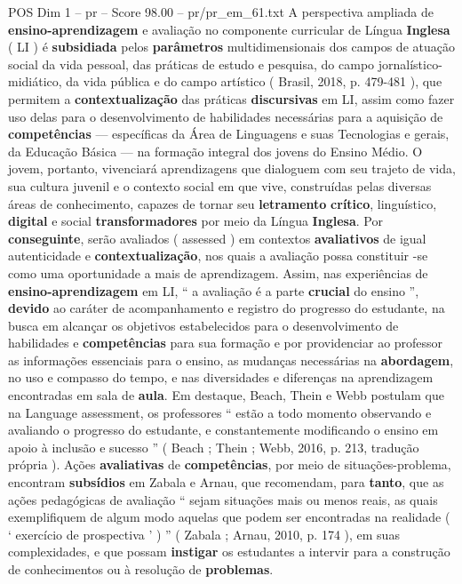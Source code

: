 \begin{textsample}{POS Dim 1 – pr – Score 98.00 – pr/pr\_em\_61.txt}
A perspectiva ampliada de \textbf{ensino-aprendizagem} e avaliação no componente curricular de Língua \textbf{Inglesa} ( LI ) é \textbf{subsidiada} pelos \textbf{parâmetros} multidimensionais dos campos de atuação social da vida pessoal, das práticas de estudo e pesquisa, do campo jornalístico-midiático, da vida pública e do campo artístico ( Brasil, 2018, p. 479-481 ), que permitem a \textbf{contextualização} das práticas \textbf{discursivas} em LI, assim como fazer uso delas para o desenvolvimento de habilidades necessárias para a aquisição de \textbf{competências} — específicas da Área de Linguagens e suas Tecnologias e gerais, da Educação Básica — na formação integral dos jovens do Ensino Médio.
O jovem, portanto, vivenciará aprendizagens que dialoguem com seu trajeto de vida, sua cultura juvenil e o contexto social em que vive, construídas pelas diversas áreas de conhecimento, capazes de tornar seu \textbf{letramento} \textbf{crítico}, linguístico, \textbf{digital} e social \textbf{transformadores} por meio da Língua \textbf{Inglesa}.
Por \textbf{conseguinte}, serão avaliados ( assessed ) em contextos \textbf{avaliativos} de igual autenticidade e \textbf{contextualização}, nos quais a avaliação possa constituir -se como uma oportunidade a mais de aprendizagem.
Assim, nas experiências de \textbf{ensino-aprendizagem} em LI, “ a avaliação é a parte \textbf{crucial} do ensino ”, \textbf{devido} ao caráter de acompanhamento e registro do progresso do estudante, na busca em alcançar os objetivos estabelecidos para o desenvolvimento de habilidades e \textbf{competências} para sua formação e por providenciar ao professor as informações essenciais para o ensino, as mudanças necessárias na \textbf{abordagem}, no uso e compasso do tempo, e nas diversidades e diferenças na aprendizagem encontradas em sala de \textbf{aula}.
Em destaque, Beach, Thein e Webb postulam que na Language assessment, os professores “ estão a todo momento observando e avaliando o progresso do estudante, e constantemente modificando o ensino em apoio à inclusão e sucesso ” ( Beach ; Thein ; Webb, 2016, p. 213, tradução própria ).
Ações \textbf{avaliativas} de \textbf{competências}, por meio de situações-problema, encontram \textbf{subsídios} em Zabala e Arnau, que recomendam, para \textbf{tanto}, que as ações pedagógicas de avaliação “ sejam situações mais ou menos reais, as quais exemplifiquem de algum modo aquelas que podem ser encontradas na realidade ( ‘ exercício de prospectiva ’ ) ” ( Zabala ; Arnau, 2010, p. 174 ), em suas complexidades, e que possam \textbf{instigar} os estudantes a intervir para a construção de conhecimentos ou à resolução de \textbf{problemas}.

\end{textsample}
